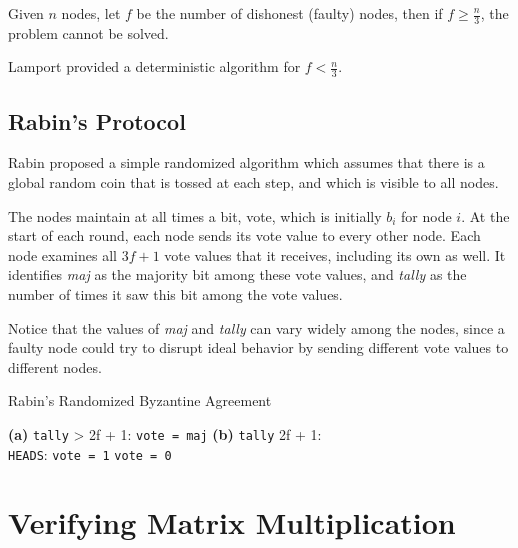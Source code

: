         Given \(n\) nodes, let \(f\) be the number of dishonest (faulty) nodes, then if \(f \geq \frac{n}{3}\), the problem cannot be solved.

        Lamport provided a deterministic algorithm for \(f < \frac{n}{3}\).

    \subsection*{Rabin's Protocol}
        Rabin proposed a simple randomized algorithm which assumes that there is a global random coin that is tossed at each step, and which is visible to all nodes.

        The nodes maintain at all times a bit, vote, which is initially \(b_i\) for node \(i\). At the start of each round, each node sends its vote value to every other node. Each node examines all \(3f + 1\) vote values that it receives, including its own as well. It identifies \emph{maj} as the majority bit among these vote values, and \emph{tally} as the number of times it saw this bit among the vote values.

        Notice that the values of \emph{maj} and \emph{tally} can vary widely among the nodes, since a faulty node could try to disrupt ideal behavior by sending different vote values to different nodes.

        \begin{algorithm}
            \caption{Rabin's Randomized Byzantine Agreement}
            \begin{algorithmic}[1]
                \State \textbf{(a)}  \texttt{tally} > 2f + 1:
                \State \quad {} \texttt{vote = maj}
                \State \textbf{(b)}  \texttt{tally} \leq 2f + 1:\\
                \State \quad {}
                \State \quad \quad {} \texttt{HEADS}:
                \State \quad \quad \quad {} \texttt{vote = 1} 
                \State \quad \quad {}
                \State \quad \quad \quad {} \texttt{vote = 0} 
            \end{algorithmic}
        \end{algorithm}

\section*{Verifying Matrix Multiplication}
